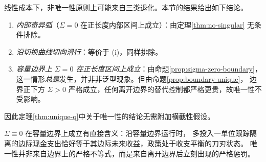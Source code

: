 \begin{remark}
\label{rmk:degeneracy}
线性成本下，非唯一性原则上可能来自三类退化。本节的结果给出如下结论。
\begin{enumerate}[label=(\roman*)]
\item \emph{内部奇异弧}（$\Sigma=0$ 在正长度内部区间上成立）：由定理\ref{thm:no-singular}
无条件排除。
\item \emph{沿切换曲线切向滑行}：等价于 (i)，同样排除。
\item \emph{容量边界上 $\Sigma=0$ 在正长度区间上成立}：由命题\ref{prop:sigma-zero-boundary}，
这一情形\emph{总是}发生，并非非泛型现象。但由命题\ref{prop:boundary-unique}，
边界正下方 $\Sigma>0$ 严格成立，任何离开边界的替代控制都严格更贵，故唯一性不受影响。
\end{enumerate}
因此定理\ref{thm:unique-q}中关于唯一性的结论无需附加横截性假设。
\end{remark}

\begin{remark}[机制解释]
$\Sigma\equiv0$ 在容量边界上成立有直接含义：沿容量边界运行时，
多投入一单位跟踪隔离的边际现金支出恰好等于其边际未来收益，政策处于收支平衡的刀刃状态。
唯一性并非来自边界上的严格不等式，而是来自离开边界后立刻出现的严格惩罚。
\end{remark}
